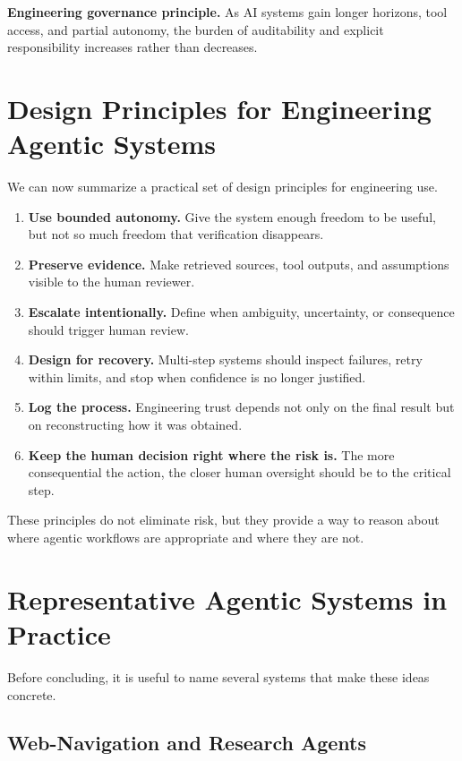 \documentclass[12pt]{article}
\begin{document}
\begin{alert-box}
\textbf{Engineering governance principle.} As AI systems gain longer horizons, tool access, and partial autonomy, the burden of auditability and explicit responsibility increases rather than decreases.
\end{alert-box}

\section{Design Principles for Engineering Agentic Systems}

We can now summarize a practical set of design principles for engineering use.

\begin{enumerate}
    \item \textbf{Use bounded autonomy.} Give the system enough freedom to be useful, but not so much freedom that verification disappears.
    \item \textbf{Preserve evidence.} Make retrieved sources, tool outputs, and assumptions visible to the human reviewer.
    \item \textbf{Escalate intentionally.} Define when ambiguity, uncertainty, or consequence should trigger human review.
    \item \textbf{Design for recovery.} Multi-step systems should inspect failures, retry within limits, and stop when confidence is no longer justified.
    \item \textbf{Log the process.} Engineering trust depends not only on the final result but on reconstructing how it was obtained.
    \item \textbf{Keep the human decision right where the risk is.} The more consequential the action, the closer human oversight should be to the critical step.
\end{enumerate}

These principles do not eliminate risk, but they provide a way to reason about where agentic workflows are appropriate and where they are not.

\section{Representative Agentic Systems in Practice}

Before concluding, it is useful to name several systems that make these ideas concrete.

\subsection{Web-Navigation and Research Agents}
\end{document}
